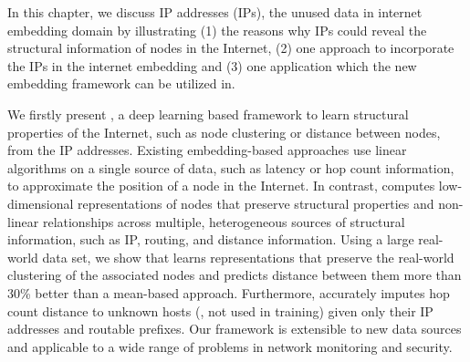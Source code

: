 In this chapter, we discuss IP addresses (IPs), the unused data in internet embedding domain by illustrating (1) the reasons why IPs could reveal the structural information of  nodes in the Internet, (2) one approach  to incorporate the IPs in the internet embedding and (3)  one application which the new embedding framework can be utilized in. 

 We firstly present \system{}, a deep learning based framework to learn structural properties of the Internet, such as node clustering or distance between nodes, from the IP addresses. 
%
Existing embedding-based approaches use linear algorithms on a single source of data, such as latency or hop count information, to approximate the position of a node in the Internet.
%
In contrast, \system{} computes low-dimensional representations of nodes that preserve structural properties and non-linear relationships across multiple, heterogeneous sources of structural information, such as IP, routing, and distance information.
%
%
Using a large real-world data set, we show that \system{} learns representations that preserve the real-world clustering of the associated nodes and predicts distance between them more than 30\% better than a mean-based approach. 
%
Furthermore, \system{} accurately imputes hop count distance to  unknown hosts (\ie{}, not used in training) given only their IP addresses and routable prefixes.
Our framework is extensible to new data sources and applicable to a wide range of problems in network monitoring and security.


